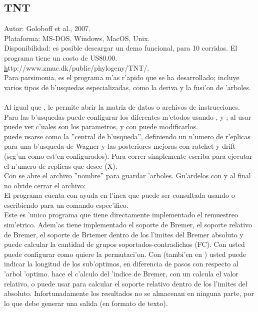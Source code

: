\subsection{TNT}
\noindent
Autor: Goloboff et al., 2007.\\
Plataforma: MS-DOS, Windows, MacOS, Unix.\\
Disponibilidad: es posible descargar un demo funcional, para 10 corridas. 
El programa tiene un costo de US80.00.\\
\href{}http://www.zmuc.dk/public/phylogeny/TNT/.
\\
Para parsimonia, es el programa m'as r'apido que se ha desarrollado; incluye varios tipos de b'usquedas especializadas, como la deriva y la fusi'on de 'arboles.\\
\\
Al igual que ,  le permite abrir la matriz de datos o archivos de instrucciones. Para las b'usquedas puede configurar los diferentes m'etodos usando ,  y ; al usar  puede ver c'uales son los parametros, y con \Cmd{=} puede modificarlos.\\  puede usarse como la ''central de b'usqueda'', definiendo un n'umero de r'eplicas para una b'usqueda de Wagner y las posteriores mejoras con ratchet y drift (seg'un como est'en configurados). Para correr simplemente escriba  para ejecutar el n'umero de replicas que desee (X).\\
Con  se abre el archivo ''nombre'' para guardar 'arboles. Gu'ardelos con  y al final no olvide cerrar el archivo: \\
El programa cuenta con ayuda en l'inea que puede ser consultada usando  o escribiendo  para un comando espec'ifico.\\
Este es 'unico programa que tiene directamente implementado el remuestreo sim'etrico. Adem'as tiene implementado el soporte de Bremer, el soporte relativo de Bremer, el soporte de Brtemer dentro de los l'imites del Bremer absoluto y puede calcular la cantidad de grupos soportados-contradichos (FC). Con  usted puede configurar como quiere la permutaci'on. Con  (tambi'en en ) usted puede indicar la longitud de los sub'optimos, en diferencia de pasos con respecto al 'arbol 'optimo.  hace el c'alculo del 'indice de Bremer, con un \Cmd{*} calcula el valor relativo, o puede usar \Cmd{Bsupport ]} para calcular el soporte relativo dentro de los l'imites del absoluto. Infortunadamente los resultados no se almacenan en ninguna parte, por lo que debe generar una salida (en formato de texto).\\

